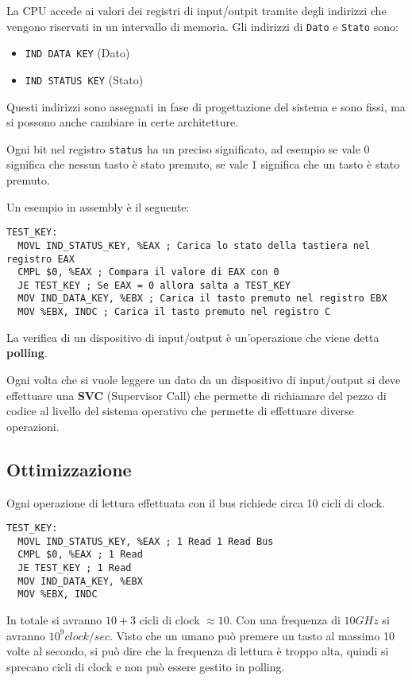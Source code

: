 \documentclass[a4paper]{article}
\theoremstyle{break}
\theoremstyle{break}
\theoremstyle{break}
\theoremstyle{break}
\begin{document}
\noindent La CPU accede ai valori dei registri di input/outpit tramite degli indirizzi
che vengono riservati in un intervallo di memoria. Gli indirizzi di \texttt{Dato} e
\texttt{Stato} sono:
\begin{itemize}
	\item \texttt{IND DATA KEY} (Dato)
	\item \texttt{IND STATUS KEY} (Stato)
\end{itemize}
Questi indirizzi sono assegnati in fase di progettazione del sistema e sono fissi,
ma si possono anche cambiare in certe architetture.

\vspace{1em}
\noindent Ogni bit nel registro \texttt{status} ha un preciso significato, ad esempio
se vale 0 significa che nessun tasto è stato premuto, se vale 1 significa che un tasto
è stato premuto.

\vspace{1em}
\noindent Un esempio in assembly è il seguente:
\begin{lstlisting}[language={[x86masm]Assembler}]
 TEST_KEY:
  MOVL IND_STATUS_KEY, %EAX ; Carica lo stato della tastiera nel registro EAX
  CMPL $0, %EAX ; Compara il valore di EAX con 0
  JE TEST_KEY ; Se EAX = 0 allora salta a TEST_KEY
  MOV IND_DATA_KEY, %EBX ; Carica il tasto premuto nel registro EBX
  MOV %EBX, INDC ; Carica il tasto premuto nel registro C
\end{lstlisting}
\noindent La verifica di un dispositivo di input/output è un'operazione che viene detta
\textbf{polling}.

\vspace{1em}
\noindent Ogni volta che si vuole leggere un dato da un dispositivo di input/output si deve
effettuare una \textbf{SVC} (Supervisor Call) che permette di richiamare del pezzo
di codice al livello del sistema operativo che permette di effettuare diverse operazioni.

\subsection{Ottimizzazione}
Ogni operazione di lettura effettuata con il bus richiede circa 10 cicli di clock.
\begin{lstlisting}[language={[x86masm]Assembler}]
 TEST_KEY:
  MOVL IND_STATUS_KEY, %EAX ; 1 Read 1 Read Bus
  CMPL $0, %EAX ; 1 Read
  JE TEST_KEY ; 1 Read
  MOV IND_DATA_KEY, %EBX 
  MOV %EBX, INDC 
\end{lstlisting}
\noindent In totale si avranno \( 10 + 3 \) cicli di clock \( \approx 10 \). Con una
frequenza di \( 10GHz \) si avranno \( 10^9 clock/sec \). Visto che un umano può premere
un tasto al massimo 10 volte al secondo, si può dire che la frequenza di lettura è
troppo alta, quindi si sprecano cicli di clock e non può essere gestito in polling.
\end{document}
